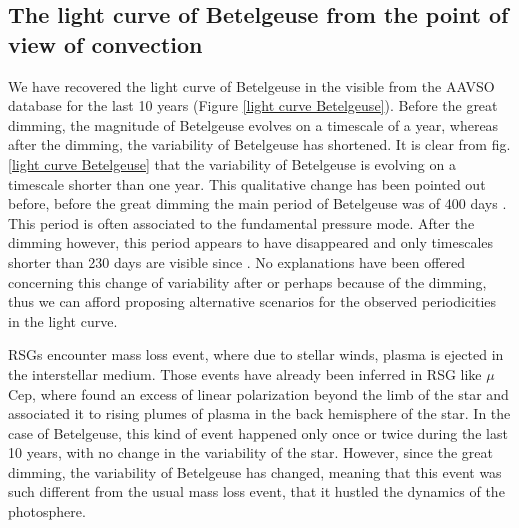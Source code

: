 \documentclass{aa}
\begin{document}
\subsection{The light curve of Betelgeuse from the point of view of convection}



We have recovered the light curve of Betelgeuse in the visible from the AAVSO database for the last 10 years (Figure \ref{light curve Betelgeuse}).
Before the great dimming, the magnitude of Betelgeuse evolves on a timescale of a year, whereas after the dimming, the variability of Betelgeuse has shortened. 
It is clear from fig. \ref{light curve Betelgeuse} that the 
variability of Betelgeuse is evolving on a timescale shorter than one year. This qualitative change has been pointed out before,
before the great dimming the main period of Betelgeuse was of 400 days \citep{kiss_variability_2006}. 
This period is often associated to the fundamental pressure mode. After the dimming however, this period appears to have disappeared 
and only timescales shorter than 230 days are visible since \citep{dupree_great_2022}. 
No explanations have been offered concerning this change of variability after or perhaps because of the dimming, thus we can afford proposing alternative scenarios for the observed periodicities in the light curve. \

RSGs encounter mass loss event, where due to stellar winds, plasma is ejected in the interstellar medium. Those events have already been inferred in RSG like $\mu$Cep, where \cite{lopez_ariste_height_2023} found an excess of linear polarization beyond the limb of the star and associated it to rising plumes of plasma in the back hemisphere of the star. In the case of Betelgeuse, this kind of event happened only once or twice during the last 10 years, with no change in the variability of the star. However, since the great dimming, the variability of Betelgeuse has changed, meaning that this event was such different from the usual mass loss event, that it hustled the dynamics of the photosphere. \
\end{document}

